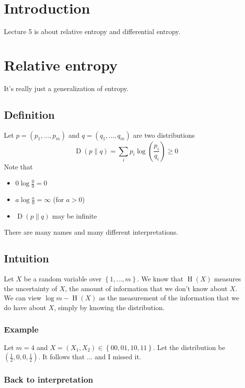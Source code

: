 \documentclass{article}
\begin{document}
\section{Introduction}

Lecture 5 is about relative entropy and differential entropy.

\section{Relative entropy}

It's really just a generalization of entropy.

\subsection{Definition}

Let $p=\left(p_1,\ldots,p_m\right)$ and $q=\left(q_1,\ldots, q_m\right)$ are two distributions
\[
\operatorname{D}\left(p\| q\right) = \sum_{i} p_i\log\left(\frac{p_i}{q_i}\right) \geq 0
\]
Note that 
\begin{itemize}
    \item $0\log \frac{0 }{0 }= 0$
    \item $a\log \frac{a }{0 }=\infty$ (for $a>0$)
    \item $\operatorname{D}\left(p\| q\right)$ may be infinite
\end{itemize}
There are many names and many different interpretations.

\subsection{Intuition}

Let $X$ be a random variable over $\left\{1,\ldots, m\right\}$. We know that $\operatorname{H}(X)$ measures the uncertainty of $X$, the amount of information that we don't know about $X$. We can view $\log m - \operatorname{H}(X)$ as the measurement of the information that we do have about $X$, simply by knowing the distribution.

\subsubsection{Example}

Let $m=4$ and $X=\left(X_1, X_2\right)\in \left\{00,01,10,11\right\}$. Let the distribution be $\left(\frac{1}{2}, 0, 0, \frac{1 }{2}\right)$. It follows that ... and I missed it.

\subsubsection{Back to interpretation}
\end{document}
